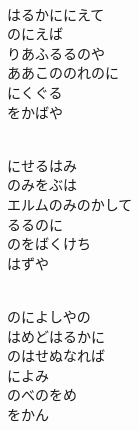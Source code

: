 \documentclass[10pt,b5j]{tarticle} %
\begin{document}
\vspace{1.5em} %
\newcommand{\linespace}{0.5em} %
\newcommand{\blocksize}{0.5\hsize} %
\newcommand{\itemmargin}{3em} %
\begin{enumerate} %
    \setlength{\itemindent}{\itemmargin} %
    \begin{minipage}[c]{\blocksize}
    
        \vspace{\linespace}
        \item~\\
        はるかににえて\\
        のにえば\\
        りあふるるのや\\
        ああこののれのに\\
        にくぐる\\
        をかばや
        
    \end{minipage}
    \begin{minipage}[c]{\blocksize}
        
        \vspace{\linespace}
        \item~\\
        にせるはみ\\
        のみをぶは\\
        エルムのみのかして\\
        るるのに\\
        のをばくけち\\
        はずや
        
    \end{minipage}
    \begin{minipage}[c]{\blocksize}
        
        \vspace{\linespace}
        \item~\\
        のによしやの\\
        はめどはるかに\\
        のはせぬなれば\\
        によみ\\
        のべのをめ\\
        をかん
        

\end{minipage}
\end{enumerate}
\end{document}
